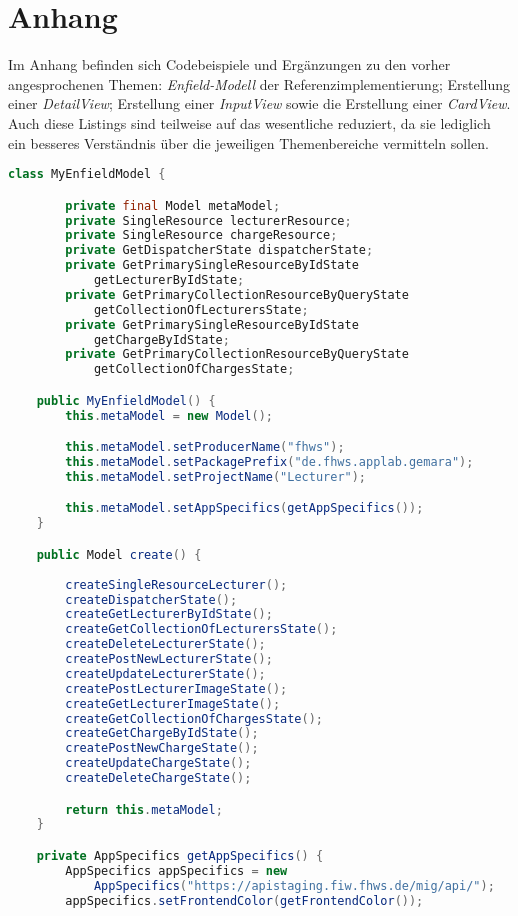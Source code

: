 \chapter{Anhang}

Im Anhang befinden sich Codebeispiele und Ergänzungen zu den vorher angesprochenen Themen: \textit{Enfield-Modell} der Referenzimplementierung; Erstellung einer \textit{DetailView}; Erstellung einer \textit{InputView} sowie die Erstellung einer \textit{CardView}. Auch diese Listings sind teilweise auf das wesentliche reduziert, da sie lediglich ein besseres Verständnis über die jeweiligen Themenbereiche vermitteln sollen.

\newpage

\begin{lstlisting}[label=lst:enfield_model,
language=java,
firstnumber=1,
caption=Beschreibung des \textit{Enfield-Modell} der Referenzimplementierung. ]
class MyEnfieldModel {

		private final Model metaModel;
		private SingleResource lecturerResource;
		private SingleResource chargeResource;
		private GetDispatcherState dispatcherState;
		private GetPrimarySingleResourceByIdState
			getLecturerByIdState;
		private GetPrimaryCollectionResourceByQueryState 
			getCollectionOfLecturersState;
		private GetPrimarySingleResourceByIdState 
			getChargeByIdState;
		private GetPrimaryCollectionResourceByQueryState 
			getCollectionOfChargesState;

	public MyEnfieldModel() {
		this.metaModel = new Model();

		this.metaModel.setProducerName("fhws");
		this.metaModel.setPackagePrefix("de.fhws.applab.gemara");
		this.metaModel.setProjectName("Lecturer");

		this.metaModel.setAppSpecifics(getAppSpecifics());
	}

	public Model create() {
	
		createSingleResourceLecturer();
		createDispatcherState();
		createGetLecturerByIdState();
		createGetCollectionOfLecturersState();
		createDeleteLecturerState();
		createPostNewLecturerState();
		createUpdateLecturerState();
		createPostLecturerImageState();
		createGetLecturerImageState();
		createGetCollectionOfChargesState();
		createGetChargeByIdState();
		createPostNewChargeState();
		createUpdateChargeState();
		createDeleteChargeState();

		return this.metaModel;
	}

	private AppSpecifics getAppSpecifics() {
		AppSpecifics appSpecifics = new 
			AppSpecifics("https://apistaging.fiw.fhws.de/mig/api/");
		appSpecifics.setFrontendColor(getFrontendColor());


\end{lstlisting}
